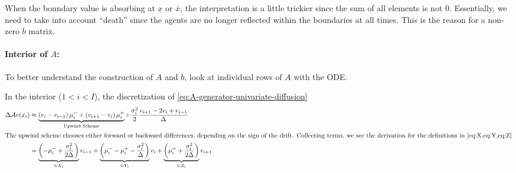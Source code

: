 \documentclass[11pt]{etk-article}
\begin{document}
When the boundary value is absorbing at $\underline{x}$ or $\bar{x}$, the interpretation is a little trickier since the sum of all elements is not $0$.  Essentially, we need to take into account ``death'' since the agents are no longer reflected within the boundaries at all times.  This is the reason for a non-zero $b$ matrix.


\paragraph{Interior of $A$:}
To better understand the construction of $A$ and $b$, look at individual rows of $A$ with the ODE.

In the interior ($1 < i < I$), the discretization of \cref{eq:A-generator-univariate-diffusion}
\begin{align}
\Delta \mathcal{A} v(x_i) &\approx \underbrace{\left(v_i-v_{i-1}\right)\mu_i^{-}+ \left(v_{i+1}-v_i\right)\mu_i^{+}}_{\text{Upwind Scheme}}  + \frac{\sigma_i^2}{2} \frac{v_{i+1} - 2 v_i + v_{i-1}}{\Delta}\label{eq:A-generator-univariate-diffusion-interior}\\
\intertext{The upwind scheme chooses either forward or backward differences, depending on the sign of the drift.  Collecting terms, we see the derivation for the definitions in \cref{eq:X,eq:Y,eq:Z}}
&= \underbrace{\left(-\mu_i^{-} +\frac{\sigma_i^2}{2\Delta}\right)}_{\equiv X_i}v_{i-1} + \underbrace{\left(\mu_i^{-} - \mu_i^{+}-\frac{\sigma_i^2}{\Delta}\right)}_{\equiv Y_i}v_i + \underbrace{\left(\mu_i^{+} + \frac{\sigma_i^2}{2\Delta}\right)}_{\equiv Z_i}v_{i+1}\label{eq:A-collected-interior}
\end{align}
\end{document}
